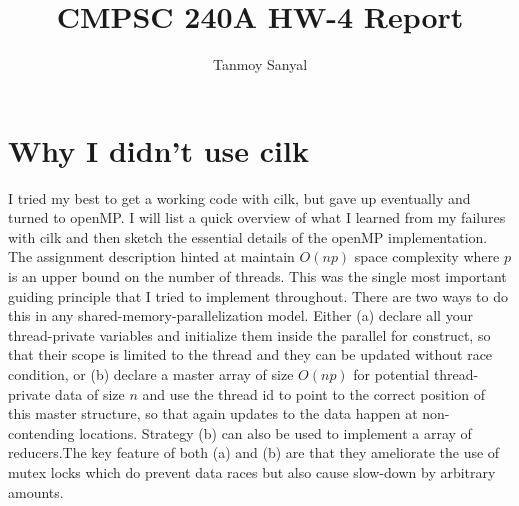 \documentclass[12pt,letterpaper]{article}
\author{Tanmoy Sanyal}
\title{CMPSC 240A HW-4 Report}
\begin{document}
\maketitle

\section*{Why I didn't use cilk}
\noindent I tried my best to get a working code with cilk, but gave up eventually and turned to openMP. I will list a quick overview of what I learned from my failures with cilk and then sketch the essential details of the openMP implementation.\\

\noindent The assignment description hinted at maintain $O(np)$ space complexity where $p$ is an upper bound on the number of threads. This was the single most important guiding principle that I tried to implement throughout. There are two ways to do this in any shared-memory-parallelization model. Either (a) declare all your thread-private variables and initialize them inside the parallel for construct, so that their scope is limited to the thread and they can be updated without race condition, or (b) declare a master array of size $O(np)$ for potential thread-private data of size $n$ and use the thread id to point to the correct position of this master structure, so that again updates to the data happen at non-contending locations. Strategy (b) can also be used to implement a array of reducers.The key feature of both (a) and (b) are that they ameliorate the use of mutex locks which do prevent data races but also cause slow-down by arbitrary amounts.\\
\end{document}

